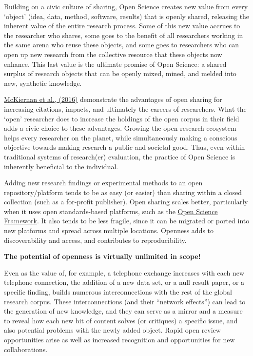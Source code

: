 \documentclass[]{book}
\begin{document}
{{{Building on a civic culture of sharing, Open Science creates new value from every `object' (idea, data, method, software, results) that is openly shared, releasing the inherent value of the entire research process. Some of this new value accrues to the researcher who shares, some goes to the benefit of all researchers working in the same arena who reuse these objects, and some goes to researchers who can open up new research from the collective resource that these objects now enhance. This last value is the ultimate promise of Open Science: a shared surplus of research objects that can be openly mixed, mined, and melded into new, synthetic knowledge.

\href{https://elifesciences.org/articles/16800}{McKiernan et al., (2016)} demonstrate the advantages of open sharing for increasing citations, impacts, and ultimately the careers of researchers. What the `open' researcher does to increase the holdings of the open corpus in their field adds a civic choice to these advantages. Growing the open research ecosystem helps every researcher on the planet, while simultaneously making a conscious objective towards making research a public and societal good. Thus, even within traditional systems of research(er) evaluation, the practice of Open Science is inherently beneficial to the individual.

Adding new research findings or experimental methods to an open repository/platform tends to be as easy (or easier) than sharing within a closed collection (such as a for-profit publisher). Open sharing scales better, particularly when it uses open standards-based platforms, such as the \href{https://osf.io/}{Open Science Framework}. It also tends to be less fragile, since it can be migrated or ported into new platforms and spread across multiple locations. Openness adds to discoverability and access, and contributes to reproducibility.

\textbf{The potential of openness is virtually unlimited in scope!}

Even as the value of, for example, a telephone exchange increases with each new telephone connection, the addition of a new data set, or a null result paper, or a specific finding, builds numerous interconnections with the rest of the global research corpus. These interconnections (and their ``network effects'') can lead to the generation of new knowledge, and they can serve as a mirror and a measure to reveal how each new bit of content solves (or critiques) a specific issue, and also potential problems with the newly added object. Rapid open review opportunities arise as well as increased recognition and opportunities for new collaborations.

}}}
\end{document}
